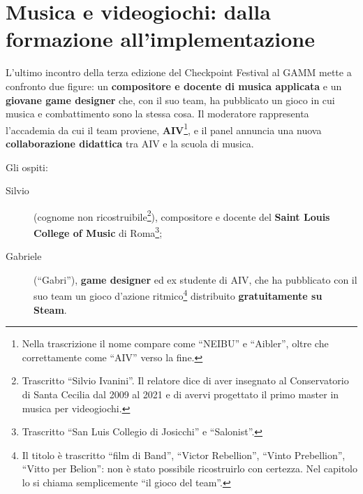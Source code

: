 
\chapter[Musica e videogiochi]{Musica e videogiochi: dalla formazione
all'implementazione}
\label{cap:c1-5-musica}

L'ultimo incontro della terza edizione del Checkpoint Festival al GAMM mette a
confronto due figure: un \textbf{compositore e docente di musica applicata} e un
\textbf{giovane game designer} che, con il suo team, ha pubblicato un gioco in
cui musica e combattimento sono la stessa cosa. Il moderatore rappresenta
l'accademia da cui il team proviene, \textbf{AIV}\footnote{Nella trascrizione il
nome compare come ``NEIBU'' e ``Aibler'', oltre che correttamente come ``AIV''
verso la fine.}, e il panel annuncia una nuova \textbf{collaborazione didattica}
tra AIV e la scuola di musica.

Gli ospiti:
\begin{description}
  \item[Silvio] (cognome non ricostruibile\footnote{Trascritto ``Silvio
        Ivanini''. Il relatore dice di aver insegnato al Conservatorio di Santa
        Cecilia dal 2009 al 2021 e di avervi progettato il primo master in musica
        per videogiochi.}), compositore e docente del \textbf{Saint Louis College
        of Music} di Roma\footnote{Trascritto ``San Luis Collegio di Josicchi'' e
        ``Salonist''.};
  \item[Gabriele] (``Gabri''), \textbf{game designer} ed ex studente di AIV,
        che ha pubblicato con il suo team un gioco d'azione ritmico\footnote{Il
        titolo è trascritto ``film di Band'', ``Victor Rebellion'', ``Vinto
        Prebellion'', ``Vitto per Belion'': non è stato possibile ricostruirlo con
        certezza. Nel capitolo lo si chiama semplicemente ``il gioco del
        team''.} distribuito \textbf{gratuitamente su Steam}.
\end{description}

